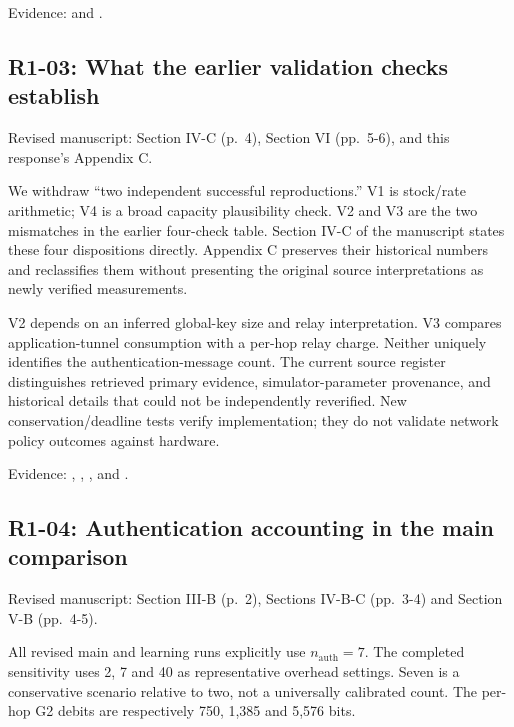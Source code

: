 Evidence:  and .

\subsection{R1-03: What the earlier validation checks establish}\label{r1-03-what-the-earlier-validation-checks-establish}

Revised manuscript: Section IV-C (p.~4), Section VI (pp.~5-6), and this response's Appendix C.

We withdraw ``two independent successful reproductions.'' V1 is stock/rate arithmetic; V4 is a broad capacity plausibility check. V2 and V3 are the two mismatches in the earlier four-check table. Section IV-C of the manuscript states these four dispositions directly. Appendix C preserves their historical numbers and reclassifies them without presenting the original source interpretations as newly verified measurements.

V2 depends on an inferred global-key size and relay interpretation. V3 compares application-tunnel consumption with a per-hop relay charge. Neither uniquely identifies the authentication-message count. The current source register distinguishes retrieved primary evidence, simulator-parameter provenance, and historical details that could not be independently reverified. New conservation/deadline tests verify implementation; they do not validate network policy outcomes against hardware.

Evidence: , , , and .

\subsection{R1-04: Authentication accounting in the main comparison}\label{r1-04-authentication-accounting-in-the-main-comparison}

Revised manuscript: Section III-B (p.~2), Sections IV-B-C (pp.~3-4) and Section V-B (pp.~4-5).

All revised main and learning runs explicitly use \(n_{\mathrm{auth}}=7\). The completed sensitivity uses 2, 7 and 40 as representative overhead settings. Seven is a conservative scenario relative to two, not a universally calibrated count. The per-hop G2 debits are respectively 750, 1,385 and 5,576 bits.

